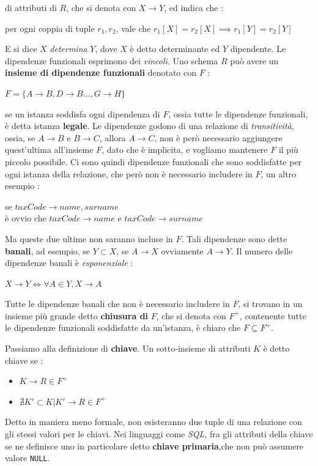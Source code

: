 \documentclass[12pt, letterpaper]{article}
\newcommand{\code}[1]{\colorbox{light-gray}{\texttt{#1}}}
\begin{document}
di attributi di \(R\), che si denota con \(X\rightarrow Y\), ed indica che :\begin{center}
    per ogni coppia di tuple \(r_1,r_2\), vale che \(r_1[X]=r_2[X]\implies r_1[Y]=r_2[Y]\)
\end{center}
E si dice \(X\) \textit{determina} \(Y\), dove \(X\) è detto determinante ed \(Y\) dipendente. Le dipendenze 
funzionali esprimono dei \textit{vincoli}. Uno schema \(R\) può avere un \textbf{insieme di dipendenze funzionali}
denotato con \(F\) :\begin{center}
    \(F=\{A\rightarrow B,D\rightarrow B...,G\rightarrow H\}\)
\end{center} se un istanza soddisfa ogni dipendenza di \(F\), ossia tutte le dipendenze funzionali, è 
detta istanza \textbf{legale}. Le dipendenze godono di una relazione di \textit{transitività}, ossia,
se \(A\rightarrow B\) e \(B\rightarrow C\), allora \(A\rightarrow C\), non è però necessario aggiungere 
quest'ultima all'insieme \(F\), dato che è implicita, e vogliamo mantenere \(F\) il più piccolo possibile. 
Ci sono quindi dipendenze funzionali che sono soddisfatte per ogni istanza della relazione, che però 
non è necessario includere in \(F\), un altro esempio :\begin{center}
    se \(taxCode\rightarrow name,surname\) \\
    è ovvio che \(taxCode\rightarrow name\)  e  \(taxCode\rightarrow surname\)
\end{center}
Ma queste due ultime non saranno incluse in \(F\). Tali dipendenze sono dette \textbf{banali}, ad 
esempio, se \(Y\subset X\), se \(A\rightarrow X\) ovviamente \(A\rightarrow Y\). Il numero delle dipendenze 
banali è \textit{esponenziale} :\begin{center}
    \(
    X\rightarrow Y \iff \forall A\in Y, X\rightarrow A    
    \)
\end{center} 
Tutte le dipendenze banali che non è necessario includere in \(F\), si trovano in un insieme 
più grande detto \textbf{chiusura di }\(F\), che si denota con \(F^+\), contenente tutte le 
dipendenze funzionali soddisfatte da un'istanza, è chiaro che \(F\subseteq F^+\).

Passiamo alla definizione di \textbf{chiave}. Un sotto-insieme di attributi \(K\) è detto chiave se :\begin{itemize}
    \item \(K\rightarrow R \in F^+\)
    \item \(\nexists K'\subset K | K'\rightarrow R \in F^+\)
\end{itemize}
Detto in maniera meno formale, non esisteranno due tuple di una relazione con gli stessi valori 
per le chiavi. Nei linguaggi come \textit{SQL}, fra gli attributi della chiave se ne definisce uno 
in particolare detto \textbf{chiave primaria},che non può assumere valore \code{NULL}.
\end{document}
